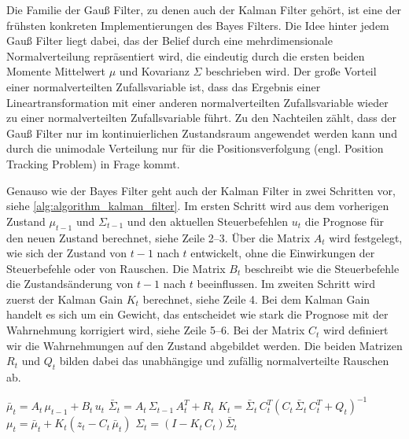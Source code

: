 Die Familie der Gauß Filter, zu denen auch der Kalman Filter gehört, ist eine der frühsten konkreten Implementierungen des Bayes Filters. Die Idee hinter jedem Gauß Filter liegt dabei, das der Belief durch eine mehrdimensionale Normalverteilung repräsentiert wird, die eindeutig durch die ersten beiden Momente Mittelwert $\mu$ und Kovarianz $\Sigma$ beschrieben wird. Der große Vorteil einer normalverteilten Zufallsvariable ist, dass das Ergebnis einer Lineartransformation mit einer anderen normalverteilten Zufallsvariable wieder zu einer normalverteilten Zufallsvariable führt. Zu den Nachteilen zählt, dass der Gauß Filter nur im kontinuierlichen Zustandsraum angewendet werden kann und durch die unimodale Verteilung nur für die Positionsverfolgung (engl. Position Tracking Problem) in Frage kommt.

Genauso wie der Bayes Filter geht auch der Kalman Filter in zwei Schritten vor, siehe \autoref{alg:algorithm_kalman_filter}. Im ersten Schritt wird aus dem vorherigen Zustand $\mu_{t-1}$ und $\Sigma_{t-1}$ und den aktuellen Steuerbefehlen $u_t$ die Prognose für den neuen Zustand berechnet, siehe Zeile 2--3. Über die Matrix $A_t$ wird festgelegt, wie sich der Zustand von $t-1$ nach $t$ entwickelt, ohne die Einwirkungen der Steuerbefehle oder von Rauschen. Die Matrix $B_t$ beschreibt wie die Steuerbefehle die Zustandsänderung von $t-1$ nach $t$ beeinflussen. Im zweiten Schritt wird zuerst der Kalman Gain $K_t$ berechnet, siehe Zeile 4. Bei dem Kalman Gain handelt es sich um ein Gewicht, das entscheidet wie stark die Prognose mit der Wahrnehmung korrigiert wird, siehe Zeile 5--6. Bei der Matrix $C_t$ wird definiert wir die Wahrnehmungen auf den Zustand abgebildet werden. Die beiden Matrizen $R_t$ und $Q_t$ bilden dabei das unabhängige und zufällig normalverteilte Rauschen ab.


\begin{algorithm}
\begin{onehalfspacing}
	\DontPrintSemicolon
	{
		$\bar{\mu}_t = A_t \, \mu_{t-1} + B_t \, u_t$\;
		$\bar{\Sigma}_t = A_t \, \Sigma_{t-1} \, A^T_t + R_t$\;
		\BlankLine
		\BlankLine
		$K_t = \bar{\Sigma}_t \, C^T_t (C_t \, \bar{\Sigma}_t \, C^T_t + Q_t)^{-1}$\;
		$\mu_t = \bar{\mu}_t + K_t (z_t - C_t \, \bar{\mu}_t)$\;
		$\Sigma_t = (I - K_t \, C_t) \bar{\Sigma}_t$\;
	}
\label{alg:algorithm_kalman_filter}
\end{onehalfspacing}
\end{algorithm}


